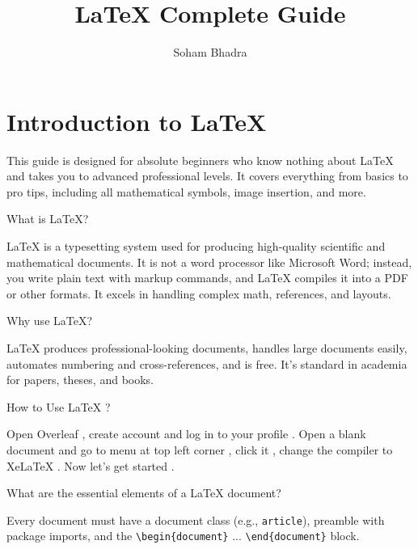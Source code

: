 \documentclass[12pt,a4paper]{article}
\title{\LaTeX{} Complete Guide}
\author{Soham Bhadra}
\date{}
\begin{document}
\maketitle
\tableofcontents
\newpage


\section{Introduction to LaTeX}

This guide is designed for absolute beginners who know nothing about LaTeX and takes you to advanced professional levels. It covers everything from basics to pro tips, including all mathematical symbols, image insertion, and more.

\begin{questionbox}
What is LaTeX?
\end{questionbox}

\begin{answerbox}
LaTeX is a typesetting system used for producing high-quality scientific and mathematical documents. It is not a word processor like Microsoft Word; instead, you write plain text with markup commands, and LaTeX compiles it into a PDF or other formats. It excels in handling complex math, references, and layouts.
\end{answerbox}

\begin{questionbox}
Why use LaTeX?
\end{questionbox}

\begin{answerbox}
LaTeX produces professional-looking documents, handles large documents easily, automates numbering and cross-references, and is free. It's standard in academia for papers, theses, and books.
\end{answerbox}

\begin{questionbox}
    How to Use LaTeX ?
\end{questionbox}

\begin{answerbox}
    Open Overleaf , create account and log in to your profile . Open a blank document and go to menu at top left corner , click it , change the compiler to XeLaTeX . Now let's get started .
\end{answerbox}
\begin{questionbox}
What are the essential elements of a LaTeX document?
\end{questionbox}
\begin{answerbox}
Every document must have a document class (e.g., \texttt{article}), preamble with package imports, and the \texttt{\textbackslash begin\{document\}} ... \texttt{\textbackslash end\{document\}} block.
\end{answerbox}
\end{document}

